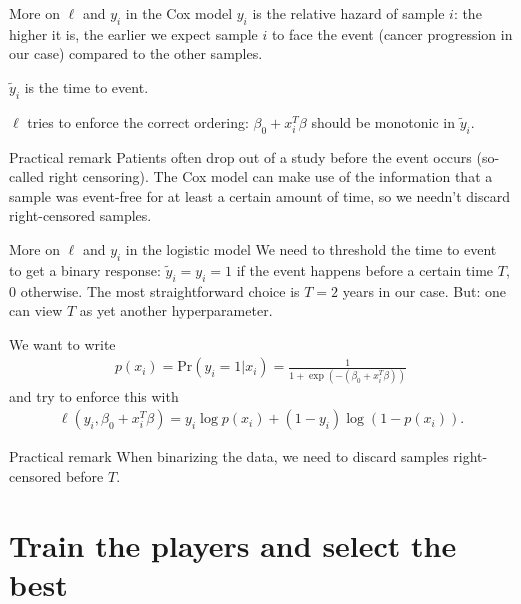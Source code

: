 \documentclass[10pt, aspectratio=169]{beamer}
\def\Pr{\mathrm{Pr}}
\begin{document}
\begin{frame}{More on $\ell$ and $y_i$ in the \alert{Cox} model}
  $y_i$ is the \alert{relative hazard} of sample $i$: the higher it is, the earlier we 
  expect sample $i$ to face the event (cancer progression in our case) compared to the 
  other samples.

  $\tilde{y}_i$ is the time to event.

  $\ell$ tries to enforce the correct ordering: $\beta_0 + x_i^T \beta$ should be monotonic 
  in $\tilde{y}_i$.

  \begin{alertblock}{Practical remark}
    Patients often drop out of a study before the event occurs (so-called right censoring).
    The Cox model can make use of the information that a sample was event-free for at least 
    a certain amount of time, so we needn't discard right-censored samples.
  \end{alertblock}
\end{frame}

\begin{frame}{More on $\ell$ and $y_i$ in the \alert{logistic} model}
  We need to \alert{threshold the time to event} to get a \alert{binary response}: 
  $\tilde{y}_i = y_i = 1$ if the event happens before a certain time $T$, $0$ otherwise. 
  The most straightforward choice is $T = 2$ years in our case. But: one can view \alert{$T$} 
  as yet \alert{another hyperparameter}.
  
  We want to write 
  \begin{align}
    p(x_i) = \Pr(y_i=1 | x_i) = \frac{1}{1 + \exp(-(\beta_0 + x_i^T \beta))}
  \end{align}
  and try to enforce this with 
  \begin{align}
    \ell(y_i, \beta_0 + x_i^T \beta) = y_i \log p(x_i) + (1 - y_i) \log(1 - p(x_i)).
  \end{align}

  \begin{alertblock}{Practical remark}
    When binarizing the data, we need to discard samples right-censored before $T$.
  \end{alertblock}
\end{frame}

\section{Train the players and select the best}
\end{document}
